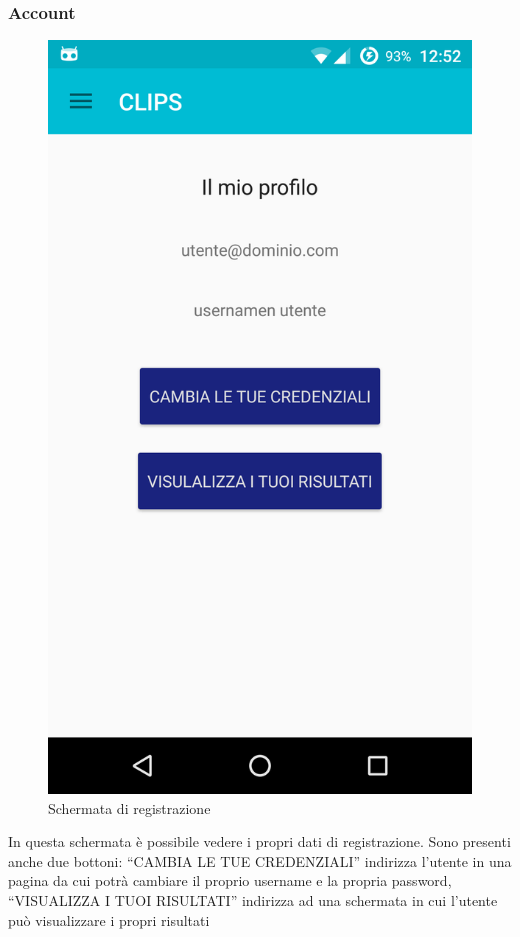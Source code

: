\subsubsection{Account}
\begin{figure}[!h]
	\centering
	\includegraphics[scale=0.15]{screenshot/account}
	\caption{Schermata di registrazione}
\end{figure}
In questa schermata è possibile vedere i propri dati di registrazione. Sono presenti anche due bottoni: ``CAMBIA LE TUE CREDENZIALI'' indirizza l'utente in una pagina da cui potrà cambiare il proprio username e la propria password, ``VISUALIZZA I TUOI RISULTATI'' indirizza ad una schermata in cui l'utente può visualizzare i propri risultati

